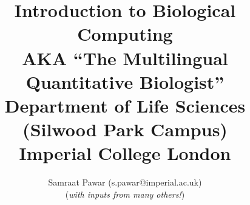 \documentclass[11pt,a4paper]{book}
\begin{document}
	
\title{Introduction to Biological Computing\\
 \vspace{24pt} 
AKA ``The Multilingual Quantitative Biologist''\\ 
 \vspace{24pt} 
 \large Department of Life Sciences (Silwood Park Campus)\\ Imperial College London}
\author{Samraat Pawar (s.pawar@imperial.ac.uk)\\
 ({\it with inputs from many others!}) 
  }

\maketitle


\tableofcontents

\mainmatter%
\setcounter{chapter}{-1}














\end{document}
